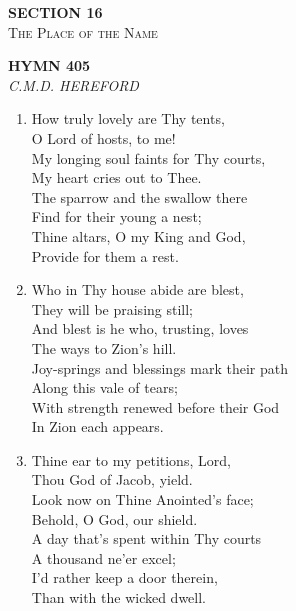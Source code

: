 \documentclass[11pt,a4paper]{article}
\begin{document}
\newpage
\thispagestyle{empty}
\vspace*{3.5cm}
\begin{center}
    {\LARGE \textbf{SECTION 16}}\\[0.8em]
    {\Large \textsc{The Place of the Name}}
\end{center}
\vspace{3.5cm}

\newpage
\begin{center}
    {\Large \textbf{HYMN 405}}
    \\
    \textit{C.M.D. HEREFORD}
\end{center}
\vspace{1em}

\begin{enumerate}
    \item How truly lovely are Thy tents, \\
        O Lord of hosts, to me! \\
        My longing soul faints for Thy courts, \\
        My heart cries out to Thee. \\
        The sparrow and the swallow there \\
        Find for their young a nest; \\
        Thine altars, O my King and God, \\
        Provide for them a rest.

    \item Who in Thy house abide are blest, \\
        They will be praising still; \\
        And blest is he who, trusting, loves \\
        The ways to Zion's hill. \\
        Joy-springs and blessings mark their path \\
        Along this vale of tears; \\
        With strength renewed before their God \\
        In Zion each appears.

    \item Thine ear to my petitions, Lord, \\
        Thou God of Jacob, yield. \\
        Look now on Thine Anointed's face; \\
        Behold, O God, our shield. \\
        A day that's spent within Thy courts \\
        A thousand ne'er excel; \\
        I'd rather keep a door therein, \\
        Than with the wicked dwell.


\end{enumerate}
\end{document}
